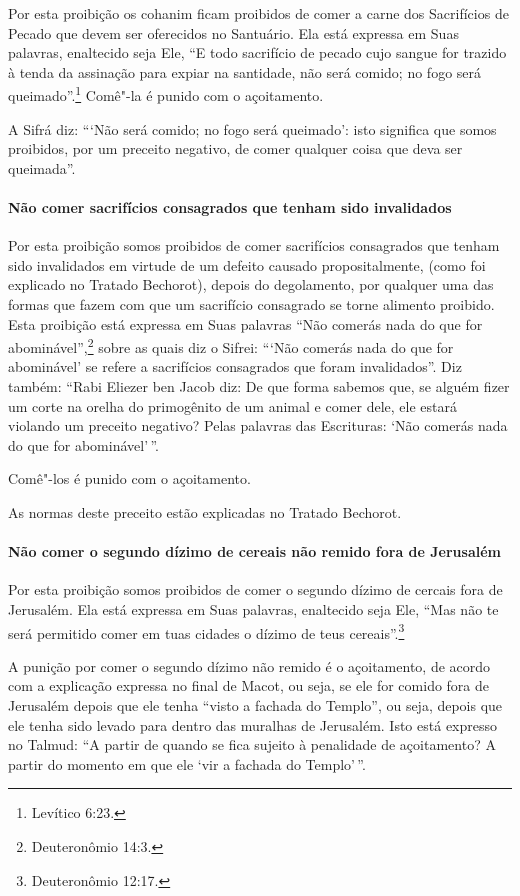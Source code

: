 \begin{multicols}{2}
Por esta proibição os cohanim\starr{} ficam proibidos de comer a carne dos
Sacrifícios de Pecado que devem ser oferecidos no Santuário. Ela está
expressa em Suas palavras, enaltecido seja Ele, ``E todo sacrifício de
pecado cujo sangue for trazido à tenda da assinação para expiar na
santidade, não será comido; no fogo será queimado''.\footnote{Levítico 6:23.}
Comê"-la é punido com o açoitamento.

A Sifrá\starr{} diz: ```Não será comido; no fogo será queimado': isto significa
que somos proibidos, por um preceito negativo, de comer qualquer coisa
que deva ser queimada''.

\paragraph{Não comer sacrifícios consagrados que tenham sido invalidados}

Por esta proibição somos proibidos de comer sacrifícios consagrados que
tenham sido invalidados em virtude de um defeito causado
propositalmente, (como foi explicado no Tratado Bechorot\starr), depois do
degolamento, por qualquer uma das formas que fazem com que um sacrifício consagrado se
torne alimento proibido. Esta proibição está expressa em Suas palavras
``Não comerás nada do que for abominável'',\footnote{Deuteronômio 14:3.} sobre
as quais diz o Sifrei\starr: ```Não comerás nada do que for abominável' se
refere a sacrifícios consagrados que foram invalidados''. Diz também:
``Rabi Eliezer ben Jacob\starr{} diz: De que forma sabemos que, se alguém fizer
um corte na orelha do primogênito de um animal e comer dele, ele estará
violando um preceito negativo? Pelas palavras das Escrituras: `Não
comerás nada do que for abominável'\,''.

Comê"-los é punido com o açoitamento.

As normas deste preceito estão explicadas no Tratado Bechorot\starr.

\paragraph{Não comer o segundo dízimo de cereais não remido fora de Jerusalém}

Por esta proibição somos proibidos de comer o segundo dízimo de cercais
fora de Jerusalém. Ela está expressa em Suas palavras, enaltecido seja
Ele, ``Mas não te será permitido comer em tuas cidades o dízimo de teus
cereais''.\footnote{Deuteronômio 12:17.}

A punição por comer o segundo dízimo não remido é o açoitamento, de
acordo com a explicação expressa no final de Macot\starr, ou seja, se ele for
comido fora de Jerusalém depois que ele tenha ``visto a fachada do
Templo'', ou seja, depois que ele tenha sido levado para dentro das
muralhas de Jerusalém. Isto está expresso no Talmud\starr: ``A partir de
quando se fica sujeito à penalidade de açoitamento? A partir do momento
em que ele `vir a fachada do Templo'\,''.


\end{multicols}
